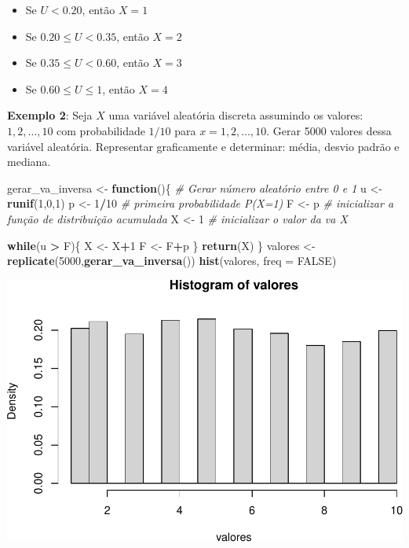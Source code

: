 \documentclass[
]{book}
\newenvironment{Shaded}{\begin{snugshade}}{\end{snugshade}}
\newcommand{\AttributeTok}[1]{\textcolor[rgb]{0.13,0.29,0.53}{#1}}
\newcommand{\CommentTok}[1]{\textcolor[rgb]{0.56,0.35,0.01}{\textit{#1}}}
\newcommand{\ConstantTok}[1]{\textcolor[rgb]{0.56,0.35,0.01}{#1}}
\newcommand{\ControlFlowTok}[1]{\textcolor[rgb]{0.13,0.29,0.53}{\textbf{#1}}}
\newcommand{\DecValTok}[1]{\textcolor[rgb]{0.00,0.00,0.81}{#1}}
\newcommand{\FunctionTok}[1]{\textcolor[rgb]{0.13,0.29,0.53}{\textbf{#1}}}
\newcommand{\NormalTok}[1]{#1}
\newcommand{\OtherTok}[1]{\textcolor[rgb]{0.56,0.35,0.01}{#1}}
\newcommand{\SpecialCharTok}[1]{\textcolor[rgb]{0.81,0.36,0.00}{\textbf{#1}}}
\providecommand{\tightlist}{%
  \setlength{\itemsep}{0pt}\setlength{\parskip}{0pt}}
\begin{document}
\begin{itemize}
\tightlist
\item
  Se \(U <0.20\), então \(X=1\)
\item
  Se \(0.20 \leq U < 0.35\), então \(X=2\)
\item
  Se \(0.35\leq U < 0.60\), então \(X=3\)
\item
  Se \(0.60 \leq U \leq 1\), então \(X=4\)
\end{itemize}

\textbf{Exemplo 2}: Seja \(X\) uma variável aleatória discreta assumindo os
valores: \(1,2,\ldots,10\) com probabilidade \(1/10\) para
\(x=1,2,\ldots,10\). Gerar 5000 valores dessa variável aleatória.
Representar graficamente e determinar: média, desvio padrão e mediana.

\begin{Shaded}
\begin{Highlighting}[]
\NormalTok{gerar\_va\_inversa }\OtherTok{\textless{}{-}} \ControlFlowTok{function}\NormalTok{()\{}
  \CommentTok{\# Gerar número aleatório entre 0 e 1}
\NormalTok{  u }\OtherTok{\textless{}{-}} \FunctionTok{runif}\NormalTok{(}\DecValTok{1}\NormalTok{,}\DecValTok{0}\NormalTok{,}\DecValTok{1}\NormalTok{)}
\NormalTok{  p }\OtherTok{\textless{}{-}} \DecValTok{1}\SpecialCharTok{/}\DecValTok{10} \CommentTok{\# primeira probabilidade P(X=1)}
\NormalTok{  F }\OtherTok{\textless{}{-}}\NormalTok{ p }\CommentTok{\# inicializar a função de distribuição acumulada}
\NormalTok{  X }\OtherTok{\textless{}{-}} \DecValTok{1} \CommentTok{\# inicializar o valor da va X}
  
  \ControlFlowTok{while}\NormalTok{(u }\SpecialCharTok{\textgreater{}}\NormalTok{ F)\{}
\NormalTok{    X }\OtherTok{\textless{}{-}}\NormalTok{ X}\SpecialCharTok{+}\DecValTok{1}
\NormalTok{    F }\OtherTok{\textless{}{-}}\NormalTok{ F}\SpecialCharTok{+}\NormalTok{p}
\NormalTok{  \}}
  \FunctionTok{return}\NormalTok{(X)}
\NormalTok{\}}
\NormalTok{valores }\OtherTok{\textless{}{-}} \FunctionTok{replicate}\NormalTok{(}\DecValTok{5000}\NormalTok{,}\FunctionTok{gerar\_va\_inversa}\NormalTok{())}
\FunctionTok{hist}\NormalTok{(valores, }\AttributeTok{freq =} \ConstantTok{FALSE}\NormalTok{)}
\end{Highlighting}
\end{Shaded}

\includegraphics{introR_files/figure-latex/unnamed-chunk-233-1.pdf}
\end{document}
